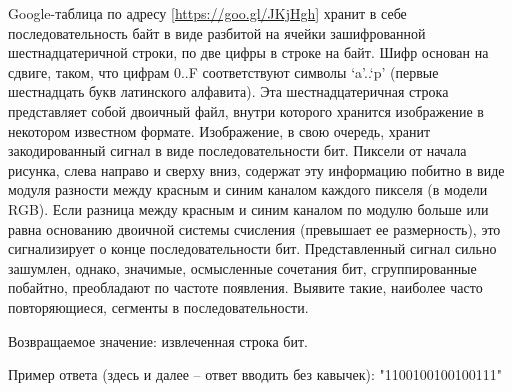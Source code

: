 
Google-таблица по адресу [\url{https://goo.gl/JKjHgh}] хранит в себе последовательность байт в виде разбитой на ячейки зашифрованной шестнадцатеричной строки, по две цифры в строке на байт. Шифр основан на сдвиге, таком, что цифрам 0..F соответствуют символы ‘a’..‘p’ (первые шестнадцать букв латинского алфавита). Эта шестнадцатеричная строка представляет собой двоичный файл, внутри которого хранится изображение в некотором известном формате. Изображение, в свою очередь, хранит закодированный сигнал в виде последовательности бит. Пиксели от начала рисунка, слева направо и сверху вниз, содержат эту информацию побитно в виде модуля разности между красным и синим каналом каждого пикселя (в модели RGB). Если разница между красным и синим каналом по модулю больше или равна основанию двоичной системы счисления (превышает ее размерность), это сигнализирует о конце последовательности бит. Представленный сигнал сильно зашумлен, однако, значимые, осмысленные сочетания бит, сгруппированные побайтно, преобладают по частоте появления. Выявите такие, наиболее часто повторяющиеся, сегменты в последовательности.

Возвращаемое значение: извлеченная строка бит.

Пример ответа (здесь и далее – ответ вводить без кавычек): "1100100100100111"

